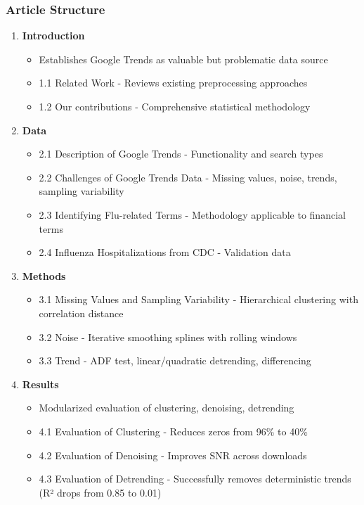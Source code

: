 \documentclass[12pt,a4paper]{article}
\begin{document}
\subsubsection{Article Structure}
\begin{enumerate}
    \item \textbf{Introduction}
    \begin{itemize}
        \item Establishes Google Trends as valuable but problematic data source
        \item 1.1 Related Work - Reviews existing preprocessing approaches
        \item 1.2 Our contributions - Comprehensive statistical methodology
    \end{itemize}
    \item \textbf{Data}
    \begin{itemize}
        \item 2.1 Description of Google Trends - Functionality and search types
        \item 2.2 Challenges of Google Trends Data - Missing values, noise, trends, sampling variability
        \item 2.3 Identifying Flu-related Terms - Methodology applicable to financial terms
        \item 2.4 Influenza Hospitalizations from CDC - Validation data
    \end{itemize}
    \item \textbf{Methods}
    \begin{itemize}
        \item 3.1 Missing Values and Sampling Variability - Hierarchical clustering with correlation distance
        \item 3.2 Noise - Iterative smoothing splines with rolling windows
        \item 3.3 Trend - ADF test, linear/quadratic detrending, differencing
    \end{itemize}
    \item \textbf{Results}
    \begin{itemize}
        \item Modularized evaluation of clustering, denoising, detrending
        \item 4.1 Evaluation of Clustering - Reduces zeros from 96\% to 40\%
        \item 4.2 Evaluation of Denoising - Improves SNR across downloads
        \item 4.3 Evaluation of Detrending - Successfully removes deterministic trends (R² drops from 0.85 to 0.01)

\end{itemize}
\end{enumerate}
\end{document}
